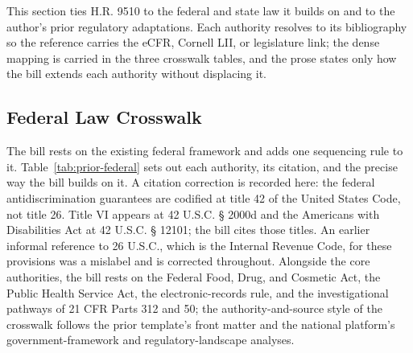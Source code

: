 
This section ties H.R. 9510 to the federal and state law it builds on and to the
author's prior regulatory adaptations. Each authority resolves to its
bibliography so the reference carries the eCFR, Cornell LII, or
legislature link; the dense mapping is carried in the three crosswalk tables, and
the prose states only how the bill extends each authority without displacing it.

\subsection{Federal Law Crosswalk}

The bill rests on the existing federal framework and adds one sequencing rule to
it. Table~\ref{tab:prior-federal} sets out each authority, its citation, and the
precise way the bill builds on it. A citation correction is recorded here: the
federal antidiscrimination guarantees are codified at title 42 of the United
States Code, not title 26. Title VI appears at 42 U.S.C. § 2000d and the
Americans with Disabilities Act at 42 U.S.C. § 12101; the bill cites those titles.
An earlier informal reference to 26 U.S.C., which is the Internal Revenue Code,
for these provisions was a mislabel and is corrected throughout. Alongside the
core authorities, the bill rests on the Federal Food, Drug, and Cosmetic Act, the
Public Health Service Act, the electronic-records rule, and the investigational
pathways of 21 CFR Parts 312 and 50; the authority-and-source style of the
crosswalk follows the prior template's front matter and the national platform's
government-framework and regulatory-landscape analyses.

